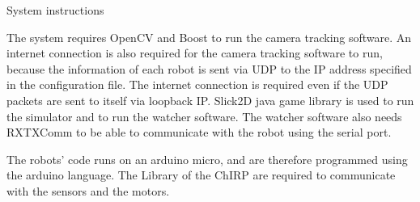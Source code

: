 System instructions

The system requires OpenCV and Boost to run the camera tracking software. An internet connection is also required for the camera tracking software to run, because the information of each robot is sent via UDP to the IP address specified in the configuration file. The internet connection is required even if the UDP packets are sent to itself via loopback IP.
Slick2D java game library is used to run the simulator and to run the watcher software. 
The watcher software also needs RXTXComm to be able to communicate with the robot using the serial port.

The robots' code runs on an arduino micro, and are therefore programmed using the arduino language. The Library of the ChIRP are required to communicate with the sensors and the motors.
